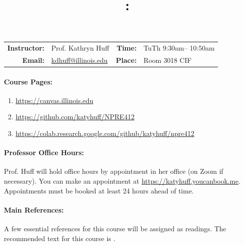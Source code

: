 \documentclass[11pt, a4paper]{article}
\title{\CourseNumber: \CourseTitle\\}
\author{\CourseUniversity}
\date{\CourseSemester \CourseYear}
\makeatletter
\newcommand{\CourseNumber}{NPRE412}
\newcommand{\CourseInstructor}{Prof. Kathryn Huff\xspace}%
\newcommand{\CourseDays}{TuTh\xspace}%
\newcommand{\CourseStart}{9:30am\xspace}%
\newcommand{\CourseEnd}{10:50am\xspace}%
\newcommand{\CourseInstructorEmail}{kdhuff@illinois.edu}
\newcommand{\HuffOfficeHourPlace}{111B Talbot\xspace}
\newcommand{\CourseRoom}{Room 3018\xspace}%
\newcommand{\CourseBuilding}{CIF\xspace}%
\makeatother
\begin{document}
\maketitle
\renewcommand{\arraystretch}{1.5}
\begin{center}
\begin{table}[h]
\begin{tabularx}{\textwidth}{rXrX}
\hline
\textbf{Instructor:} & \CourseInstructor & \textbf{Time:} & \CourseDays \CourseStart -- \CourseEnd \\
\textbf{Email:} &  \href{mailto:\CourseInstructorEmail}{\CourseInstructorEmail} & \textbf{Place:} & \CourseRoom \CourseBuilding\\
\hline
\end{tabularx}
\end{table}
\end{center}

\paragraph{Course Pages:}
\begin{enumerate}
        \item \url{https://canvas.illinois.edu}
        \item \url{https://github.com/katyhuff/\CourseNumber}
        \item \url{https://colab.research.google.com/github/katyhuff/npre412}
\end{enumerate}


\paragraph{Professor Office Hours:} Prof. Huff will hold office hours by 
appointment in her office (on Zoom if necessary). You can make an appointment at 
\url{https://katyhuff.youcanbook.me}. Appointments must be booked at least 24 hours 
ahead of time.

\paragraph{Main References:}
A few essential references for this course will be assigned as readings. The 
recommended text for this course is \cite{tsoulfanidis_nuclear_2013}.

\renewcommand{\refname}{\normalfont\selectfont\normalsize}

\end{document}
